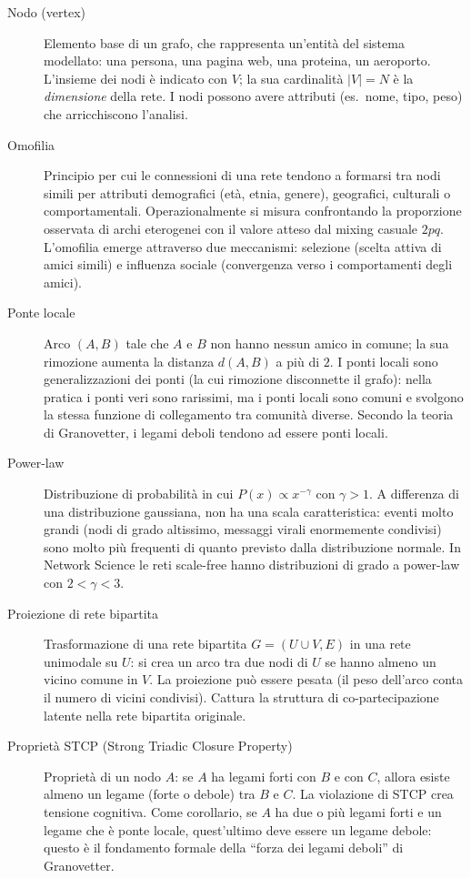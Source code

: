 \documentclass[12pt,a4paper]{article}
\begin{document}
\begin{description}
  \item[Nodo (vertex)] Elemento base di un grafo, che rappresenta un'entità del sistema
  modellato: una persona, una pagina web, una proteina, un aeroporto. L'insieme dei nodi
  è indicato con $V$; la sua cardinalità $|V|=N$ è la \textit{dimensione} della rete.
  I nodi possono avere attributi (es.\ nome, tipo, peso) che arricchiscono l'analisi.

  \item[Omofilia] Principio per cui le connessioni di una rete tendono a formarsi tra
  nodi simili per attributi demografici (età, etnia, genere), geografici, culturali o
  comportamentali. Operazionalmente si misura confrontando la proporzione osservata di
  archi eterogenei con il valore atteso dal mixing casuale $2pq$. L'omofilia emerge
  attraverso due meccanismi: selezione (scelta attiva di amici simili) e influenza
  sociale (convergenza verso i comportamenti degli amici).

  \item[Ponte locale] Arco $(A,B)$ tale che $A$ e $B$ non hanno nessun amico in comune;
  la sua rimozione aumenta la distanza $d(A,B)$ a più di $2$. I ponti locali sono
  generalizzazioni dei ponti (la cui rimozione disconnette il grafo): nella pratica i
  ponti veri sono rarissimi, ma i ponti locali sono comuni e svolgono la stessa funzione
  di collegamento tra comunità diverse. Secondo la teoria di Granovetter, i legami
  deboli tendono ad essere ponti locali.

  \item[Power-law] Distribuzione di probabilità in cui $P(x) \propto x^{-\gamma}$ con
  $\gamma > 1$. A differenza di una distribuzione gaussiana, non ha una scala
  caratteristica: eventi molto grandi (nodi di grado altissimo, messaggi virali
  enormemente condivisi) sono molto più frequenti di quanto previsto dalla distribuzione
  normale. In Network Science le reti scale-free hanno distribuzioni di grado a
  power-law con $2 < \gamma < 3$.

  \item[Proiezione di rete bipartita] Trasformazione di una rete bipartita $G=(U\cup V,
  E)$ in una rete unimodale su $U$: si crea un arco tra due nodi di $U$ se hanno almeno
  un vicino comune in $V$. La proiezione può essere pesata (il peso dell'arco conta il
  numero di vicini condivisi). Cattura la struttura di co-partecipazione latente nella
  rete bipartita originale.

  \item[Proprietà STCP (Strong Triadic Closure Property)] Proprietà di un nodo $A$:
  se $A$ ha legami forti con $B$ e con $C$, allora esiste almeno un legame (forte o
  debole) tra $B$ e $C$. La violazione di STCP crea tensione cognitiva. Come corollario,
  se $A$ ha due o più legami forti e un legame che è ponte locale, quest'ultimo deve
  essere un legame debole: questo è il fondamento formale della ``forza dei legami
  deboli'' di Granovetter.


\end{description}
\end{document}
